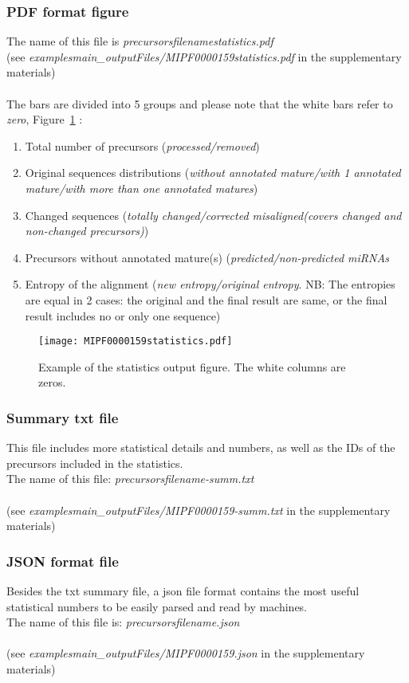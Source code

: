 \documentclass[a4paper,20pt]{report}
\begin{document}
\subsubsection{PDF format figure}
\label{sec:statpdf}
\noindent
The name of this file is \textit{precursorsfilenamestatistics.pdf}\\
(see \textit{examples\/main\_outputFiles/MIPF0000159statistics.pdf} in the supplementary materials)\\\\
The bars are divided into 5 groups and please note that the white bars refer to \textit{zero}, Figure~\ref{fig:MIPF0000159statistics.pdf} :
\begin{enumerate}[label=\alph*)]
 \item Total number of precursors (\textit{processed/removed})
 \item Original sequences distributions (\textit{without annotated mature/with 1 annotated mature/with more than one annotated matures})
 \item Changed sequences (\textit{totally changed/corrected misaligned(covers changed and non-changed precursors)})
 \item Precursors without annotated mature(s) (\textit{predicted/non-predicted miRNAs}
 \item Entropy of the alignment (\textit{new entropy/original entropy}. NB: The entropies are equal in 2 cases: the original and
 the final result are same, or the final result includes no or only one sequence)
\end{enumerate}
\begin{figure}[h]
  \begin{center}
    \texttt{[image: MIPF0000159statistics.pdf]}
  \end{center}
  \caption{Example of the statistics output figure. The white columns are zeros.}
  \label{fig:MIPF0000159statistics.pdf}
\end{figure}

\subsubsection{Summary txt file}
\label{sec:sumtxt}
\noindent
This file includes  more statistical details and numbers, as well as the IDs of the precursors included in the statistics.\\ The name of 
this file: \textit{precursorsfilename-summ.txt}\\\\
(see \textit{examples\/main\_outputFiles/MIPF0000159-summ.txt} in the supplementary materials)

\subsubsection{JSON format file}
\noindent
Besides the txt summary file, a json file format contains the most useful statistical numbers to be easily 
parsed and read by machines.\\
The name of this file is: \textit{precursorsfilename.json}\\\\
(see \textit{examples\/main\_outputFiles/MIPF0000159.json} in the supplementary materials)
\end{document}

